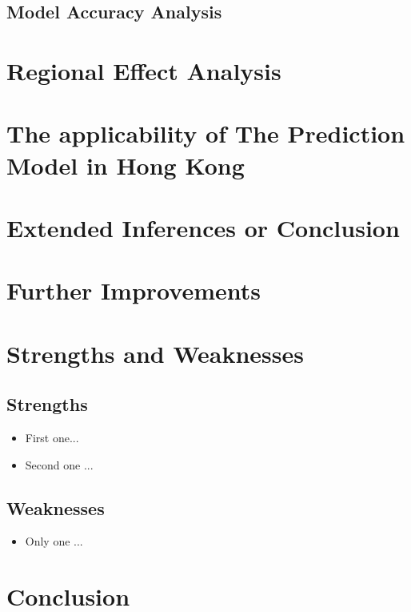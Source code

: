 \documentclass[12pt]{article}  %
\begin{document}
\subsection{Model Accuracy Analysis}


\section{Regional Effect Analysis}

\section{The applicability of The Prediction Model in Hong Kong}

\section{Extended Inferences or Conclusion}

\section{Further Improvements}

\section{Strengths and Weaknesses}
\subsection{Strengths}
\begin{itemize}
    \item First one...
    \item Second one ...
\end{itemize}

\subsection{Weaknesses}
\begin{itemize}
    \item Only one ...
 \end{itemize}

\section{Conclusion}
\end{document}
